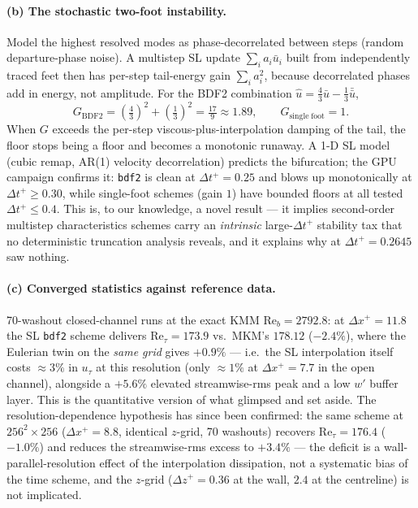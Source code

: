 \documentclass[11pt,a4paper]{article}
\newcommand{\ut}{u_\tau}
\newcommand{\Ret}{\mathrm{Re}_\tau}
\newcommand{\Reb}{\mathrm{Re}_b}
\newcommand{\dtp}{\Delta t^{+}}
\begin{document}
\paragraph{(b) The stochastic two-foot instability.} Model the highest
resolved modes as phase-decorrelated between steps (random departure-phase
noise). A multistep SL update $\sum_i a_i \bar u_i$ built from independently
traced feet then has per-step tail-energy gain $\sum_i a_i^2$, because
decorrelated phases add in energy, not amplitude. For the BDF2 combination
$\hat u = \tfrac43\bar u - \tfrac13\bar{\bar u}$,
\begin{equation}
\boxed{\;
G_{\mathrm{BDF2}} = \left(\tfrac43\right)^{2}+\left(\tfrac13\right)^{2}
= \tfrac{17}{9}\approx 1.89,
\qquad
G_{\mathrm{single\;foot}} = 1.
\;}
\label{eq:gain}
\end{equation}
When $G$ exceeds the per-step viscous-plus-interpolation damping of the tail,
the floor stops being a floor and becomes a monotonic runaway. A 1-D SL model
(cubic remap, AR(1) velocity decorrelation) predicts the bifurcation; the GPU
campaign confirms it: \texttt{bdf2} is clean at $\dtp=0.25$ and blows up
monotonically at $\dtp\ge0.30$, while single-foot schemes (gain $1$) have
bounded floors at all tested $\dtp\le0.4$. This is, to our knowledge, a novel
result --- it implies second-order multistep characteristics schemes carry an
\emph{intrinsic} large-$\dtp$ stability tax that no deterministic truncation
analysis reveals, and it explains why \cite{xu02} at $\dtp=0.2645$ saw
nothing.

\paragraph{(c) Converged statistics against reference data.} 70-washout
closed-channel runs at the exact KMM $\Reb=2792.8$: at
$\Delta x^{+}=11.8$ the SL \texttt{bdf2} scheme delivers
$\Ret = 173.9$ vs.\ MKM's $178.12$ ($-2.4\%$), where the Eulerian twin
on the \emph{same grid} gives $+0.9\%$ --- i.e.\ the SL interpolation itself
costs $\approx3\%$ in $\ut$ at this resolution (only $\approx1\%$ at
$\Delta x^{+}=7.7$ in the open channel), alongside a $+5.6\%$ elevated
streamwise-rms peak and a low $w'$ buffer layer. This is the quantitative
version of what \cite{xu02} glimpsed and set aside. The
resolution-dependence hypothesis has since been confirmed: the same scheme at
$256^2\times256$ ($\Delta x^{+}=8.8$, identical $z$-grid, 70 washouts)
recovers $\Ret=176.4$ ($-1.0\%$) and reduces the streamwise-rms excess to
$+3.4\%$ --- the deficit is a wall-parallel-resolution effect of the
interpolation dissipation, not a systematic bias of the time scheme, and the
$z$-grid ($\Delta z^{+}=0.36$ at the wall, $2.4$ at the centreline) is not
implicated.
\end{document}
